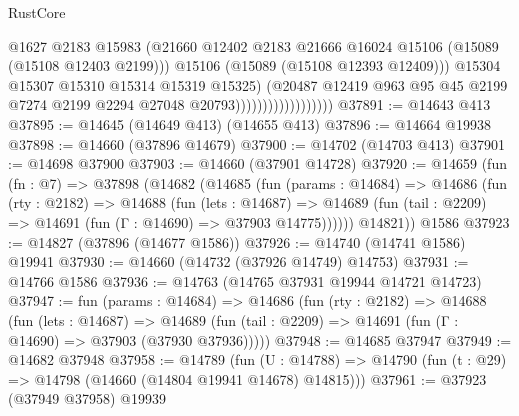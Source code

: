 \begin{lexlean}{RustCore}
\begin{coremodule}
                                          @1627
                                          @2183
                                          @15983
                                          (@21660
                                            @12402
                                            @2183
                                            @21666
                                            @16024
                                            @15106
                                            (@15089 (@15108 @12403 @2199)))
                                          @15106
                                          (@15089 (@15108 @12393 @12409)))
                                        @15304
                                        @15307
                                        @15310
                                        @15314
                                        @15319
                                        @15325)
                                      (@20487
                                        @12419
                                        @963
                                        @95
                                        @45
                                        @2199
                                        @7274
                                        @2199
                                        @2294
                                        @27048
                                        @20793))))))))))))))))))
@37891 := @14643 @413
@37895 := @14645 (@14649 @413) (@14655 @413)
@37896 := @14664 @19938
@37898 := @14660 (@37896 @14679)
@37900 := @14702 (@14703 @413)
@37901 := @14698 @37900
@37903 := @14660 (@37901 @14728)
@37920 := @14659
    (fun (fn : @7) =>
    @37898
      (@14682
        (@14685
          (fun (params : @14684) =>
          @14686
            (fun (rty : @2182) =>
            @14688
              (fun (lets : @14687) =>
              @14689 (fun (tail : @2209) => @14691 (fun (Γ : @14690) => @37903 @14775))))))
        @14821))
    @1586
@37923 := @14827 (@37896 (@14677 @1586))
@37926 := @14740 (@14741 @1586) @19941
@37930 := @14660 (@14732 (@37926 @14749) @14753)
@37931 := @14766 @1586
@37936 := @14763 (@14765 @37931 @19944 @14721 @14723)
@37947 := fun (params : @14684) =>
  @14686
    (fun (rty : @2182) =>
    @14688
      (fun (lets : @14687) =>
      @14689 (fun (tail : @2209) => @14691 (fun (Γ : @14690) => @37903 (@37930 @37936)))))
@37948 := @14685 @37947
@37949 := @14682 @37948
@37958 := @14789
    (fun (U : @14788) => @14790 (fun (t : @29) => @14798 (@14660 (@14804 @19941 @14678) @14815)))
@37961 := @37923 (@37949 @37958) @19939

\end{coremodule}
\end{lexlean}
